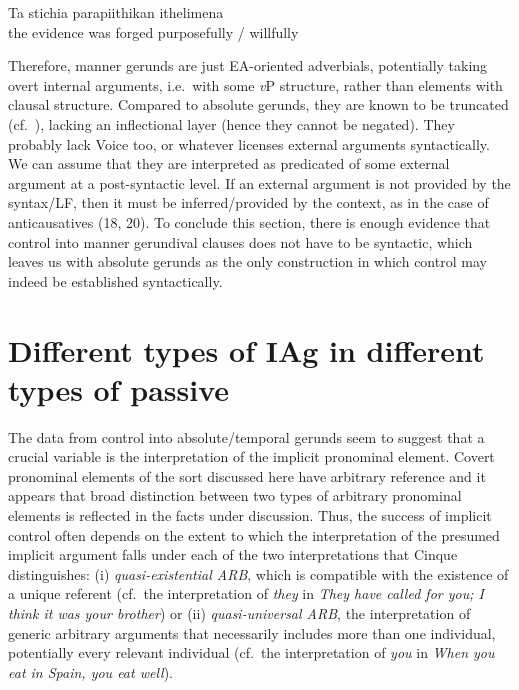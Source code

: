 \documentclass[output=paper]{langsci/langscibook}
\begin{document}
\ea%
    \label{ex:key:22.26}
    \gll    Ta      stichia    parapiithikan ithelimena\\
            the evidence  {was forged} {purposefully / willfully}\\
\z

Therefore, manner gerunds are just \gls{EA}-oriented adverbials, potentially
taking overt internal arguments, i.e.\ with some \emph{v}P structure, rather
than elements with clausal structure. Compared to absolute gerunds, they are
known to be truncated (cf.\ \citealt{Tsimpli2000}), lacking an inflectional
layer (hence they cannot be negated). They probably lack Voice too, or whatever
licenses external arguments syntactically. We can assume that they are
interpreted as predicated of some external argument at a post-syntactic level.
If an external argument is not provided by the syntax/LF, then it must be
inferred/provided by the context, as in the case of anticausatives (18, 20). To
conclude this section, there is enough evidence that control into manner
gerundival clauses does not have to be syntactic, which leaves us with absolute
gerunds as the only construction in which control may indeed be established
syntactically.

\section{Different types of \gls{IAg} in different types of
passive}\label{sec:key:22.4}

The data from control into absolute/temporal gerunds seem to suggest that a
crucial variable is the interpretation of the implicit pronominal element.
Covert pronominal elements of the sort discussed here have arbitrary reference
and it appears that  broad distinction between two types of
arbitrary pronominal elements is reflected in the facts under discussion. Thus,
the success of implicit control often depends on
the extent to which the interpretation of
the presumed implicit argument falls under each of the
two interpretations that Cinque distinguishes: (i) \emph{quasi-existential
ARB}, which is compatible with the existence of a unique referent (cf.\ the
interpretation of \emph{they} in \emph{They have called for you; I think it was
your brother}) or (ii) \emph{quasi-universal ARB}, the interpretation of
generic arbitrary arguments that necessarily includes more than one individual,
potentially every relevant individual (cf.\ the interpretation of \emph{you} in
\emph{When you eat in Spain, you eat well}).
\end{document}

